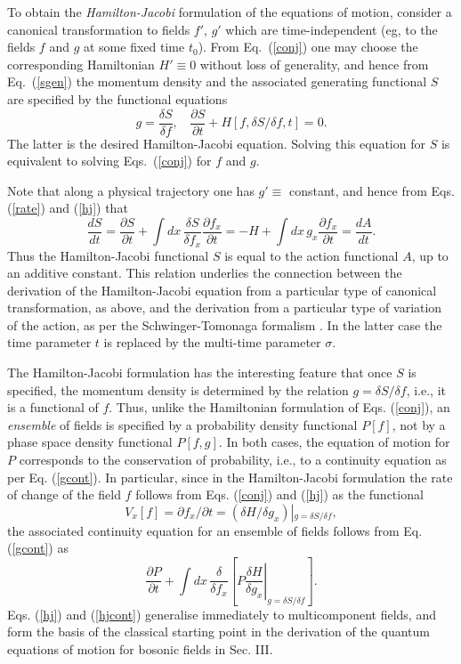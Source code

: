 \documentclass[a4paper,preprint, showpacs, aps, draft]{revtex4}
\begin{document}
{{To obtain the {\it Hamilton-Jacobi} formulation of the  equations of
motion, consider a
canonical transformation to fields $f'$, $g'$ which are time-independent
(eg, to the fields $f$ and $g$ at some fixed time $t_0$). From 
Eq.~(\ref{conj}) one may  
choose the corresponding Hamiltonian $H'\equiv 0$ 
without loss of generality, and hence from 
Eq.~(\ref{sgen}) the momentum density and the associated
generating functional $S$ are specified by the functional equations
\begin{equation} \label{hj}
g=\frac{\delta S}{\delta f},~~~~
\frac{\partial S}{\partial t} + H[f, \delta S/\delta f,t] = 0 .
\end{equation}
The latter is the desired Hamilton-Jacobi equation. Solving this equation for
$S$ is equivalent to solving Eqs.~(\ref{conj}) for $f$ and $g$. 

Note that along a physical trajectory one has $g'\equiv$ constant, 
and hence from Eqs. (\ref{rate}) and
(\ref{hj}) that  
\[
\frac{dS}{dt} = \frac{\partial S}{\partial t} + \int dx\, \frac{\delta
S}{\delta f_x} \frac{\partial f_x}{\partial t} = -H + \int
dx\,g_x\frac{\partial f_x}{\partial t} = \frac{dA}{dt} . \]
Thus the Hamilton-Jacobi functional $S$ is equal to the action
functional $A$, up to an additive 
constant.  This relation underlies the connection
 between the derivation of the Hamilton-Jacobi equation from a
particular type of canonical transformation, as above, and the
derivation from a particular type of variation of the action, as per the
Schwinger-Tomonaga formalism \cite{wheeler,schwinger}.  In the latter case the
time parameter $t$ is replaced by the multi-time parameter
$\sigma$. 

The Hamilton-Jacobi formulation has the interesting feature that once $S$
is specified, the momentum density is determined by the relation
$g=\delta S/\delta f$, i.e., it is a functional of $f$.  Thus, unlike
the Hamiltonian formulation of Eqs. (\ref{conj}), an {\it ensemble} of
fields is specified by a probability density functional $P[f]$, not by a
phase space density functional $P[f,g]$. 
In both cases, the equation of motion for $P$ corresponds to the
conservation of probability, i.e., to a continuity equation as per Eq.
(\ref{gcont}).  In particular, since in the Hamilton-Jacobi formulation
the rate of change of the field $f$ follows from Eqs. (\ref{conj})
and (\ref{hj}) as the functional 
\[
V_x[f] = \partial f_x/\partial t = (\delta H/\delta g_x)
\left|{}_{g=\delta S/\delta f}\right. ,\]
the associated continuity equation for an ensemble of fields
follows from Eq. (\ref{gcont}) as  \cite{footnoteb}
\begin{equation} \label{hjcont}
\frac{\partial P}{\partial t} + \int dx\, \frac{\delta}{\delta f_x}
\left[ P \left. \frac{\delta H}{\delta g_x}\right|_{g=\delta S/\delta f}
\right] . 
\end{equation}
Eqs. (\ref{hj}) and (\ref{hjcont}) generalise immediately to
multicomponent fields, and form the basis of the classical
starting point in the derivation of the quantum equations of motion for
bosonic fields in Sec. III.

}}
\end{document}
